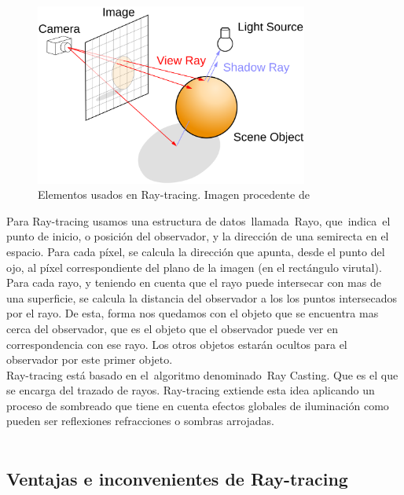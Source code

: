 \begin{figure}[h]
	\begin{center}
		\includegraphics[width=0.8\textwidth]{imagenes/tracing}
	\end{center}
	\caption{Elementos usados en Ray-tracing. Imagen procedente de \cite{ref8}}
	\label{fig:etiq_51}
\end{figure}

Para Ray-tracing usamos una estructura de datos llamada Rayo, que indica el punto de inicio, o posición del observador, y la dirección de una semirecta en el espacio. Para cada píxel, se calcula la dirección que apunta, desde el punto del ojo, al píxel correspondiente del plano de la imagen (en el rectángulo virutal). Para cada rayo, y teniendo en cuenta que el rayo puede intersecar con mas de una superficie, se calcula la distancia del observador a los los puntos intersecados por el rayo. De esta, forma nos quedamos con el objeto que se encuentra mas cerca del observador, que es el objeto que el observador puede ver en correspondencia con ese rayo. Los otros objetos estarán ocultos para el observador por este primer objeto.
${ }$\\

Ray-tracing está basado en el algoritmo denominado Ray Casting. Que es el que se encarga del trazado de rayos. Ray-tracing extiende esta idea aplicando un proceso de sombreado que tiene en cuenta efectos globales de iluminación como pueden ser reflexiones refracciones o sombras arrojadas.
${ }$\\

${ }$\\
\subsection{Ventajas e inconvenientes de Ray-tracing}
${ }$\\




